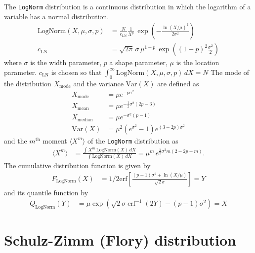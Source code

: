 The \texttt{LogNorm} distribution is a continuous distribution in
which the logarithm of a variable has a normal distribution.
\begin{subequations}
\begin{align}
\text{LogNorm}(X,\mu,\sigma,p) &=  \frac{N}{c_\text{LN}}
                                    \frac{1}{X^{p}}\,
                                    \exp\!\!\left(-\frac{\ln(X/\mu)^2}{2\sigma^2}\right) \\
c_\text{LN} &= \sqrt{2\pi}\,\sigma \,\mu^{1-p}
\,\exp\!\!\left((1-p)^2\frac{\sigma^2}{2}\right)
\label{eq:LogNormal}
\end{align}
\end{subequations}
where $\sigma$ is the width parameter, $p$ a shape parameter, $\mu$ is the location parameter.
$c_\text{LN}$ is chosen so that $\int_0^\infty\! \text{LogNorm}(X,\mu,\sigma,p)\,dX = N$
The mode of the distribution $X_\text{mode}$ and the variance
$\text{Var}(X)$ are defined as
\begin{align}
X_\text{mode} &= \mu e^{-p \sigma^2} \\
X_\text{mean} &= \mu e^{-\frac{1}{2}\sigma^2 \left(2p-3\right)} \\
X_\text{median} &= \mu e^{-\sigma^2 \left(p-1\right)} \\
\text{Var}(X) &= \mu ^2 \left(e^{\sigma^2}-1\right) e^{(3-2 p) \sigma^2}
\end{align}
and the $m^\text{th}$ moment $\langle X^m\rangle$ of the \texttt{LogNorm} distribution as
\begin{align}
\langle X^m\rangle &= \frac{\int X^m\, \textrm{LogNorm}(X)\, dX}{\int \textrm{LogNorm}(X)\, dX} =
\mu^m \, e^{\frac{1}{2} \sigma^2 m (2 - 2 p + m)}.
\label{eq:nMoment:LogNormal}
\end{align}
The cumulative distribution function is given by
\begin{align}
F_\textrm{LogNorm}(X) &=
1/2 \textrm{erf}\left[\frac{(p-1) \sigma^2 + \ln(X/\mu)}{\sqrt{2} \sigma}\right] = Y
\end{align}
and its quantile function by
\begin{align}
Q_\textrm{LogNorm}(Y) &= \mu\exp\left(\sqrt{2} \sigma\operatorname{erf}^{-1}(2Y)-(p-1) \sigma^2\right) = X
\end{align}

\clearpage
\section{Schulz-Zimm (Flory) distribution}
\label{sec:SchulzZimm}

